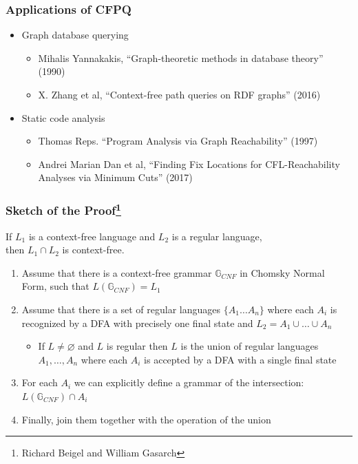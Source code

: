 \documentclass[xcolor=table]{beamer}
\begin{document}
\begin{frame} \frametitle{Applications of CFPQ}
\begin{itemize}
	\item Graph database querying
  \begin{itemize}
  	\item Mihalis Yannakakis, ``Graph-theoretic methods in database theory'' (1990)
    \item X. Zhang et al, ``Context-free path queries on RDF graphs'' (2016)
  \end{itemize}
  \pause
  \item Static code analysis
  \begin{itemize}
  	\item Thomas Reps. ``Program Analysis via Graph Reachability'' (1997)
    \item Andrei Marian Dan et al, ``Finding Fix Locations for CFL-Reachability Analyses via Minimum Cuts'' (2017)
  \end{itemize}
\end{itemize}
\end{frame}


\begin{frame} \frametitle{Sketch of the Proof\footnote{Richard Beigel and William Gasarch}}

\begin{theorem}
	If $L_1$ is a context-free language and $L_2$ is a regular language, \\ then $L_1 \cap L_2$ is context-free.
\end{theorem}


\begin{enumerate}
  \item Assume that there is a context-free grammar $\mathbb{G}_{CNF}$ in Chomsky Normal Form, such that $L(\mathbb{G}_{CNF}) = L_1$
  \pause
  \item Assume that there is a set of regular languages $\{A_1 \ldots A_n\}$ where each $A_i$ is recognized by a DFA with precisely one final state and $L_2 = A_1 \cup \ldots \cup A_n$
  \pause
  \begin{itemize}
    \item If $ L \neq \varnothing $ and $L$ is regular then $L$ is the union of regular languages $A_1, \ldots , A_n$ where each $A_i$ is accepted by a DFA with a single final state
  \end{itemize}
  \pause
  \item For each $A_i$ we can explicitly define a grammar of the intersection: $L(\mathbb{G}_{CNF}) \cap A_i$
  \pause
  \item Finally, join them together with the operation of the union
\end{enumerate}

\end{frame}
\end{document}
